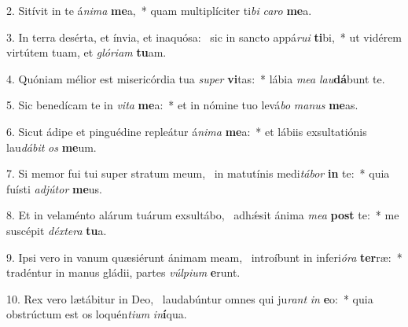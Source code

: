 2. Sitívit in te á\textit{ni}\textit{ma} \textbf{me}a,~*  quam multiplíciter ti\textit{bi} \textit{ca}\textit{ro} \textbf{me}a.\

3. In terra desérta, et ínvia, et inaquósa: \dag\  sic in sancto appá\textit{ru}\textit{i} \textbf{ti}bi,~*  ut vidérem virtútem tuam, et \textit{gló}\textit{ri}\textit{am} \textbf{tu}am.\

4. Quóniam mélior est misericórdia tua \textit{su}\textit{per} \textbf{vi}tas:~*  lábia \textit{me}\textit{a} \textit{lau}\textbf{dá}bunt te.\

5. Sic benedícam te in \textit{vi}\textit{ta} \textbf{me}a:~*  et in nómine tuo levá\textit{bo} \textit{ma}\textit{nus} \textbf{me}as.\

6. Sicut ádipe et pinguédine repleátur á\textit{ni}\textit{ma} \textbf{me}a:~*  et lábiis exsultatiónis lau\textit{dá}\textit{bit} \textit{os} \textbf{me}um.\

7. Si memor fui tui super stratum meum, \dag\  in matutínis medi\textit{tá}\textit{bor} \textbf{in} te:~*  quia fuísti \textit{ad}\textit{jú}\textit{tor} \textbf{me}us.\

8. Et in velaménto alárum tuárum exsultábo, \dag\  adhǽsit ánima \textit{me}\textit{a} \textbf{post} te:~*  me suscépit \textit{déx}\textit{te}\textit{ra} \textbf{tu}a.\

9. Ipsi vero in vanum quæsiérunt ánimam meam, \dag\  introíbunt in inferi\textit{ó}\textit{ra} \textbf{ter}ræ:~*  tradéntur in manus gládii, partes \textit{vúl}\textit{pi}\textit{um} \textbf{e}runt.\

10. Rex vero lætábitur in Deo, \dag\  laudabúntur omnes qui ju\textit{rant} \textit{in} \textbf{e}o:~*  quia obstrúctum est os loquén\textit{ti}\textit{um} \textit{in}\textbf{í}qua.\

